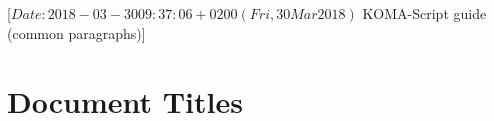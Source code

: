 %
%
%
%
%
%
%
%
% 
%
%
%
%

                 [$Date: 2018-03-30 09:37:06 +0200 (Fri, 30 Mar 2018) $
                  KOMA-Script guide (common paragraphs)]



\section{Document Titles}
%
\BeginIndexGroup
{}%

